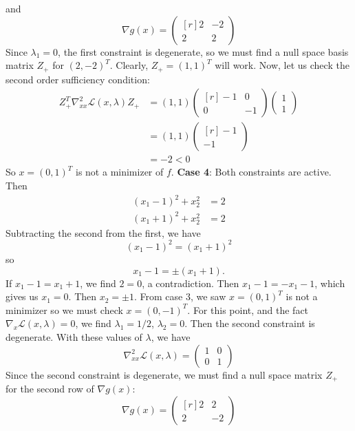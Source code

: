 \documentclass{article}
\begin{document}
and
\[\nabla g(x) = \begin{pmatrix*}[r]
    2 & -2\\
    2 & 2
\end{pmatrix*}\]
Since $\lambda_1 = 0$, the first constraint is degenerate, so we must find a null space basis matrix $Z_+$ for $(2,-2)^T$. Clearly, $Z_+ = (1,1)^T$ will work. Now, let us check the second order sufficiency condition:
\begin{align*}
    Z_+^T\nabla_{xx}^2\mathscr{L}(x, \lambda)Z_+ &= (1,1)\begin{pmatrix*}[r]
        -1 & 0\\
        0 & -1
    \end{pmatrix*}
    \begin{pmatrix}
        1\\
        1
    \end{pmatrix}\\
    &= (1,1)\begin{pmatrix*}[r]
        -1\\
        -1
    \end{pmatrix*}\\
    &= -2 < 0
\end{align*}
So $x = (0,1)^T$ is not a minimizer of $f$.
\newline\newline
\textbf{Case 4}: Both constraints are active.
\newline
Then 
\begin{align*}
    (x_1 - 1)^2 + x_2^2 &= 2\\
    (x_1 + 1)^2 + x_2^2 &= 2
\end{align*}
Subtracting the second from the first, we have 
\[(x_1 - 1)^2 = (x_1 + 1)^2\]
so 
\[x_1 - 1 = \pm (x_1 + 1).\]
If $x_1 - 1 = x_1 + 1$, we find $2 = 0$, a contradiction. Then $x_1 - 1 = -x_1 - 1$, which gives us $x_1 = 0$. Then $x_2 = \pm 1$. From case 3, we saw $x = (0,1)^T$ is not a minimizer so we must check $x = (0,-1)^T$. For this point, and the fact $\nabla_x\mathscr{L}(x,\lambda) = 0$, we find $\lambda_1 = 1/2$, $\lambda_2 = 0$. Then the second constraint is degenerate. With these values of $\lambda$, we have
\[\nabla_{xx}^2\mathscr{L}(x, \lambda) = \begin{pmatrix}
    1 & 0\\
    0 & 1
\end{pmatrix}\]
Since the second constraint is degenerate, we must find a null space matrix $Z_+$ for the second row of $\nabla g(x)$:
\[\nabla g(x) = \begin{pmatrix*}[r]
    2 & 2\\
    2 & -2
\end{pmatrix*}\]
\end{document}
